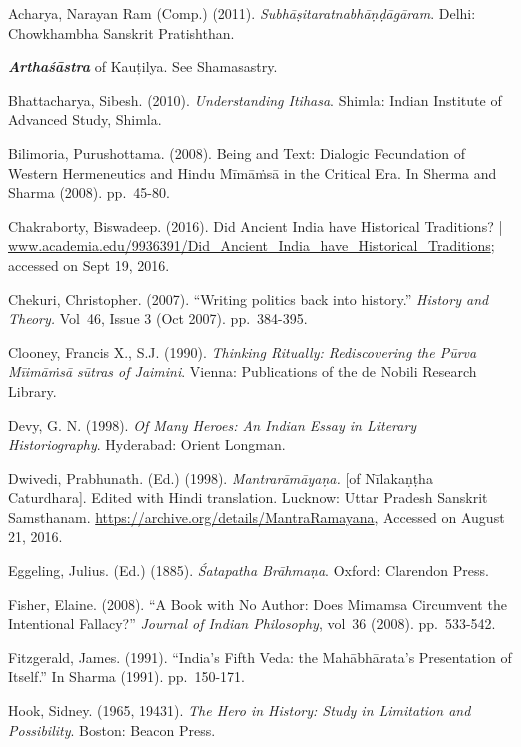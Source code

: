 \begin{thebibliography}{99}
 Acharya, Narayan Ram (Comp.) (2011). \textit{Subhāṣitaratnabhāṇḍāgāram}. Delhi: Chowkhambha Sanskrit Pratishthan.

  \textbf{\textit{Arthaśāstra}} of Kauṭilya. See Shamasastry.

  Bhattacharya, Sibesh. (2010). \textit{Understanding Itihasa}. Shimla: Indian Institute of Advanced Study, Shimla.

  Bilimoria, Purushottama. (2008). Being and Text: Dialogic Fecundation of Western Hermeneutics and Hindu Mīmāṁsā in the Critical Era. In Sherma and Sharma (2008). pp.~45-80.

  Chakraborty, Biswadeep. (2016). Did Ancient India have Historical Traditions? | \url{www.academia.edu/9936391/Did_Ancient_India_have_Historical_Traditions}; accessed on Sept 19, 2016.

  Chekuri, Christopher. (2007). “Writing politics back into history.” \textit{History and Theory.} Vol~46, Issue 3 (Oct 2007). pp.~384-395.

  Clooney, Francis X., S.J. (1990). \textit{Thinking Ritually: Rediscovering the Pūrva Mīimāṁsā sūtras of Jaimini}. Vienna: Publications of the de Nobili Research Library.

  Devy, G. N. (1998). \textit{Of Many Heroes: An Indian Essay in Literary Historiography}. Hyderabad: Orient Longman.

  Dwivedi, Prabhunath. (Ed.) (1998). \textit{Mantrarāmāyaṇa.} [of Nīlakaṇṭha Caturdhara]. Edited with Hindi translation. Lucknow: Uttar Pradesh Sanskrit Samsthanam. \url{https://archive.org/details/MantraRamayana}, Accessed on August 21, 2016.

  Eggeling, Julius. (Ed.) (1885). \textit{Śatapatha Brāhmaṇa}. Oxford: Clarendon Press.

  Fisher, Elaine. (2008). “A Book with No Author: Does Mimamsa Circumvent the Intentional Fallacy?” \textit{Journal of Indian Philosophy}, vol~36 (2008). pp.~533-542.

  Fitzgerald, James. (1991). “India’s Fifth Veda: the Mahābhārata’s Presentation of Itself.” In Sharma (1991). pp.~150-171.

  Hook, Sidney. (1965, 19431). \textit{The Hero in History: Study in Limitation and Possibility}. Boston: Beacon Press.


\end{thebibliography}
